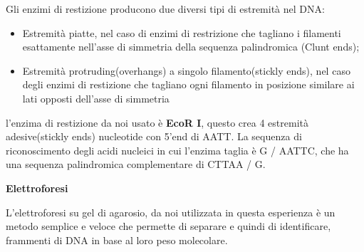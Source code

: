 Gli enzimi di restizione producono due diversi tipi di estremità nel DNA:
\begin{itemize}
Quest'esperienza in laboratorio si divide in due fasi:

\begin{itemize}

	\item Restrizione del DNA

	\item Preparazione delle componenti per l'elettroforesi

\end{itemize}

Durante la fase di Restrizione del DNA, dobbiamo fare in modo che all'interno del plasmide pUC18 venga inserito il gene di interesse e quello per la resistenza all'ampicillina.
\vspace{0.3cm}

Durante la fase di Preparazione dei componenti per l'elettroforesi invece bisognerà preparare il gel di agarosio, dove poi andranno a correre le due concentrazioni di plasmide, uno digerito e l'altro non digerito.

	\item Estremità piatte, nel caso di enzimi di restrizione che tagliano i filamenti esattamente nell'asse di simmetria della sequenza palindromica (Clunt ends);
	\item Estremità protruding(overhangs) a singolo filamento(stickly ends), nel caso degli enzimi di restizione che tagliano ogni filamento in posizione similare ai lati opposti dell'asse di simmetria

\end{itemize}

l'enzima di restizione da noi usato è \textbf{EcoR I}, questo crea 4 estremità adesive(stickly ends) nucleotide con  5'end  di AATT. La sequenza di riconoscimento degli acidi nucleici in cui l'enzima taglia è G / ​​AATTC, che ha una sequenza palindromica complementare di CTTAA / G.

\vspace{0.5cm}


\textbf{Elettroforesi }

\vspace{0.3cm}



L'elettroforesi su gel di agarosio, da noi utilizzata in questa esperienza è un metodo semplice e veloce che permette di separare e quindi di identificare, frammenti di DNA in base al loro peso molecolare.


